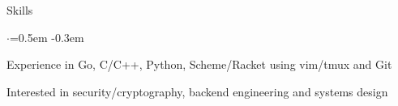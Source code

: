 \documentclass{resume} %
\begin{document}

\begin{rSection}{Skills}
  \vspace {0.3em}
  \begin{list}{$\cdot$}{\leftmargin=0.5em}
    \itemsep -0.3em \vspace{-0.3em}
    \item Experience in Go, C/C++, Python, Scheme/Racket using vim/tmux and Git
    \item Interested in security/cryptography, backend engineering and systems design
  \end{list}
  \vspace{0.3em}
\end{rSection}
\end{document}
